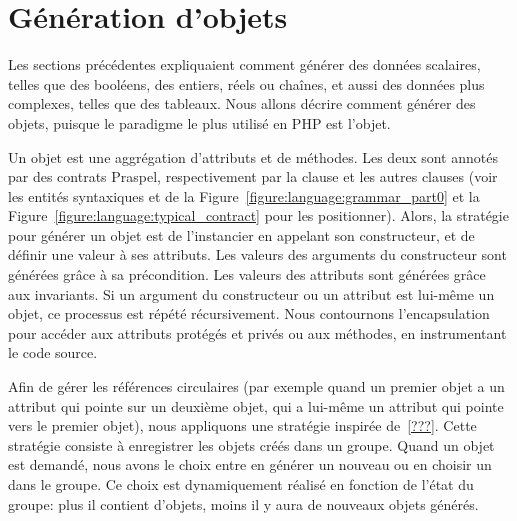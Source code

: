 \section{Génération d'objets}
\label{section:data:objects}

Les sections précédentes expliquaient comment générer des données scalaires,
telles que des booléens, des entiers, réels ou chaînes, et aussi des données
plus complexes, telles que des tableaux. Nous allons décrire comment générer des
objets, puisque le paradigme le plus utilisé en PHP est l'objet.

Un objet est une aggrégation d'attributs et de méthodes. Les deux sont annotés
par des contrats Praspel, respectivement par la clause \ainvariant et les autres
clauses (voir les entités syntaxiques  et
 de la Figure~\ref{figure:language:grammar_part0} et la
Figure~\ref{figure:language:typical_contract} pour les positionner). Alors, la
stratégie pour générer un objet est de l'instancier en appelant son
constructeur, et de définir une valeur à ses attributs. Les valeurs des
arguments du constructeur sont générées grâce à sa précondition. Les valeurs des
attributs sont générées grâce aux invariants. Si un argument du constructeur ou
un attribut est lui-même un objet, ce processus est répété récursivement. Nous
contournons l'encapsulation pour accéder aux attributs protégés et privés ou aux
méthodes, en instrumentant le code source.

Afin de gérer les références circulaires (par exemple quand un premier objet a
un attribut qui pointe sur un deuxième objet, qui a lui-même un attribut qui
pointe vers le premier objet), nous appliquons une stratégie inspirée
de~\ref{???}. Cette stratégie consiste à enregistrer les objets créés dans un
groupe. Quand un objet est demandé, nous avons le choix entre en générer un
nouveau ou en choisir un dans le groupe. Ce choix est dynamiquement réalisé en
fonction de l'état du groupe: plus il contient d'objets, moins il y aura de
nouveaux objets générés.
